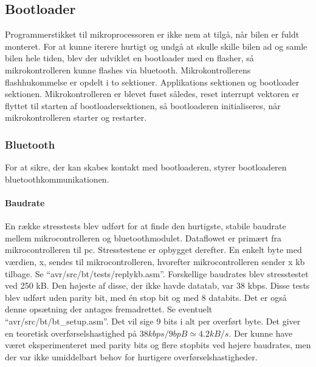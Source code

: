 \subsection{Bootloader}
Programmerstikket til mikroprocessoren er ikke nem at tilgå, når bilen er fuldt monteret. For at kunne iterere hurtigt og undgå at skulle skille bilen ad og samle bilen hele tiden, blev der udviklet en bootloader med en flasher, så mikrokontrolleren kunne flashes via bluetooth.
Mikrokontrollerens flashhukommelse er opdelt i to sektioner. Applikations sektionen og bootloader sektionen. Mikrokontrolleren er blevet fuset således, reset interrupt vektoren er flyttet til starten af bootloadersektionen, så bootloaderen initialiseres, når mikrokontrolleren starter og restarter.

\subsubsection{Bluetooth}
For at sikre, der kan skabes kontakt med bootloaderen, styrer bootloaderen bluetoothkommunikationen.
\paragraph{Baudrate}
En række stresstests blev udført for at finde den hurtigste, stabile baudrate mellem mikrocontrolleren og bluetoothmodulet. Dataflowet er primært fra mikrocontrolleren til pc. Stresstestene er opbygget derefter.
En enkelt byte med værdien, x, sendes til mikrocontrolleren, hvorefter mikrocontrolleren sender x kb tilbage.
Se ``avr/src/bt/tests/replykb.asm''.
Forskellige baudrates blev stresstestet ved 250 kB. Den højeste af disse, der ikke havde datatab, var 38 kbps. Disse tests blev udført uden parity bit, med én stop bit og med 8 databits. Det er også denne opsætning der antages fremadrettet. Se eventuelt ``avr/src/bt/bt\_setup.asm''. Det vil sige 9 bits i alt per overført byte. Det giver en teoretisk overførselshastighed på $38 kbps / 9 bpB \simeq 4.2 kB/s$. Der kunne have været eksperimenteret med parity bits og flere stopbits ved højere baudrates, men der var ikke umiddelbart behov for hurtigere overførselshastigheder.
